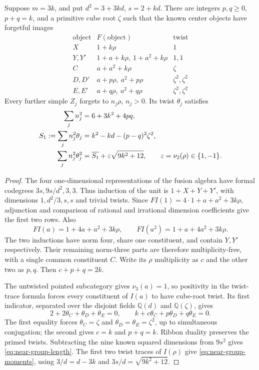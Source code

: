 \begin{lemma}\label{lem:near-group-induction}
Suppose $m=3k$, and put $d^2=3+3kd$, $s=2+kd$.
There are integers $p,q\ge0$, $p+q=k$, and a primitive cube root
$\zeta$ such that the known center objects have forgetful images
\[
\begin{array}{c|c|c}
 \text{object}&F(\text{object})&\text{twist}\\\hline
 X&1+k\rho&1\\
 Y,Y'&1+a+k\rho,\ 1+a^2+k\rho&1,1\\
 C&a+a^2+k\rho&\zeta\\
 D,D'&a+p\rho,\ a^2+p\rho&\zeta^2,\zeta^2\\
 E,E'&a+q\rho,\ a^2+q\rho&\zeta^2,\zeta^2
\end{array}
\]
Every further simple $Z_j$ forgets to $n_j\rho$, $n_j>0$. Its twist
$\theta_j$ satisfies
\begin{align}
 \sum_jn_j^2&=6+3k^2+4pq,\label{eq:near-group-length}\\
 S_1:=\sum_jn_j^2\theta_j&=k^2-kd-(p-q)^2\zeta^2,\notag\\
 \sum_jn_j^2\theta_j^2&=\overline{S_1}
                 +\varepsilon\sqrt{9k^2+12},
 \qquad\varepsilon=\nu_2(\rho)\in\{1,-1\}.
 \label{eq:near-group-moments}
\end{align}
\end{lemma}
\begin{proof}
The four one-dimensional representations of the fusion algebra have
formal codegrees $3s,9s/d^2,3,3$. Thus induction of the unit is
$1+X+Y+Y'$, with dimensions $1,d^2/3,s,s$ and trivial twists.
Since $FI(1)=4\cdot1+a+a^2+3k\rho$, adjunction and comparison of
rational and irrational dimension coefficients give the first two
rows. Also
\[
 FI(a)=1+4a+a^2+3k\rho,\qquad
 FI(a^2)=1+a+4a^2+3k\rho.
\]
The two inductions have norm four, share one constituent, and contain
$Y,Y'$ respectively. Their remaining norm-three parts are therefore
multiplicity-free, with a single common constituent $C$.
Write its $\rho$ multiplicity as $c$ and the other two as $p,q$.
Then $c+p+q=2k$.

The untwisted pointed subcategory gives $\nu_3(a)=1$, so positivity
in the twist-trace formula forces every constituent of $I(a)$ to
have cube-root twist. Its first indicator, separated over the
disjoint fields $\mathbb Q(d)$ and $\mathbb Q(\zeta)$, gives
\[
 2+2\theta_C+\theta_D+\theta_E=0,\qquad
 k+c\theta_C+p\theta_D+q\theta_E=0.
\]
The first equality forces $\theta_C=\zeta$ and
$\theta_D=\theta_E=\zeta^2$, up to simultaneous conjugation; the
second gives $c=k$ and $p+q=k$. Ribbon duality preserves the primed
twists. Subtracting the nine known squared dimensions from $9s^2$
gives \eqref{eq:near-group-length}. The first two twist traces of
$I(\rho)$ give \eqref{eq:near-group-moments}, using
$3/d=d-3k$ and $3s/d=\sqrt{9k^2+12}$.
\end{proof}


